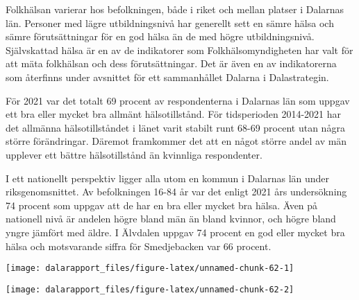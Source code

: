 \documentclass[
]{article}
\begin{document}
Folkhälsan varierar hos befolkningen, både i riket och mellan platser i
Dalarnas län. Personer med lägre utbildningsnivå har generellt sett en
sämre hälsa och sämre förutsättningar för en god hälsa än de med högre
utbildningsnivå. Självskattad hälsa är en av de indikatorer som
Folkhälsomyndigheten har valt för att mäta folkhälsan och dess
förutsättningar. Det är även en av indikatorerna som återfinns under
avsnittet för ett sammanhållet Dalarna i Dalastrategin.

För 2021 var det totalt 69 procent av respondenterna i Dalarnas län som
uppgav ett bra eller mycket bra allmänt hälsotillstånd. För tidsperioden
2014-2021 har det allmänna hälsotillståndet i länet varit stabilt runt
68-69 procent utan några större förändringar. Däremot framkommer det att
en något större andel av män upplever ett bättre hälsotillstånd än
kvinnliga respondenter.

I ett nationellt perspektiv ligger alla utom en kommun i Dalarnas län
under riksgenomsnittet. Av befolkningen 16-84 år var det enligt 2021 års
undersökning 74 procent som uppgav att de har en bra eller mycket bra
hälsa. Även på nationell nivå är andelen högre bland män än bland
kvinnor, och högre bland yngre jämfört med äldre. I Älvdalen uppgav 74
procent en god eller mycket bra hälsa och motsvarande siffra för
Smedjebacken var 66 procent.

\begin{center}\texttt{[image: dalarapport\_files/figure-latex/unnamed-chunk-62-1]} \end{center}

\begin{center}\texttt{[image: dalarapport\_files/figure-latex/unnamed-chunk-62-2]} \end{center}
\end{document}
